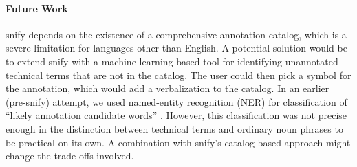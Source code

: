 \documentclass[runningheads]{llncs}
\newcommand\snify{\textsf{snify}\xspace}
\begin{document}
\paragraph{Future Work}
\snify depends on the existence of a comprehensive annotation catalog,
which is a severe limitation for languages other than English.
A potential solution would be to extend \snify with a machine
learning-based tool for identifying unannotated technical terms that are not in the
catalog.  The user could then pick a symbol for the annotation, which would add a
verbalization to the catalog.  In an earlier (pre-\snify) attempt, we used named-entity
recognition (NER) for classification of ``likely annotation candidate words''
\cite{hutterer:msc23}. However, this classification was not precise enough in the
distinction between technical terms and ordinary noun phrases to be practical on
its own.  A combination with \snify's catalog-based approach might change the trade-offs
involved.





\printbibliography
\end{document}
